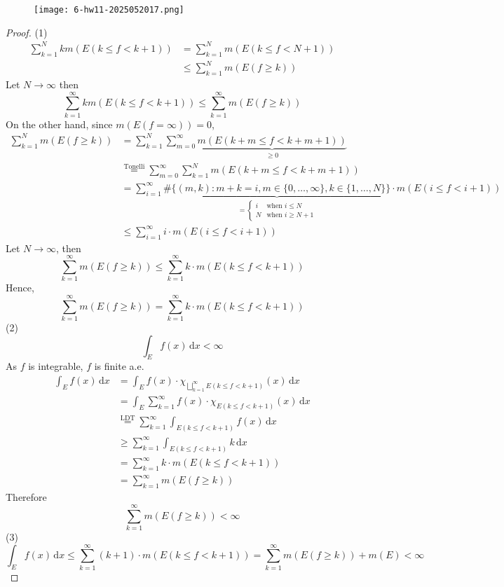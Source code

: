 \begin{exercise}
\begin{figure}[H]
\centering
\texttt{[image: 6-hw11-2025052017.png]}
\label{}
\end{figure}
\end{exercise}
\begin{proof}
(1)
\[
\begin{aligned}
\sum_{k=1}^{N} km(E(k\leq f<k+1)) & =\sum_{k=1}^{N} m(E(k\leq f<N+1))  \\
 & \leq \sum_{k=1}^{N} m(E(f\geq k)) 
\end{aligned}
\]
Let $N\to \infty$ then
\[
\sum_{k=1}^{\infty}km(E(k\leq f<k+1))\leq \sum_{k=1}^{\infty} m(E(f\geq k))
\]
On the other hand, since $m(E(f=\infty))=0$,
\[
\begin{aligned}
\sum_{k=1}^{N} m(E(f\geq k)) & =\sum_{k=1}^{N} \sum_{m=0}^{\infty} \underbrace{ m(E(k+m\leq f<k+m+1)) }_{ \geq 0 } \\
 & \overset{ \text{Tonelli} }{ = }\sum_{m=0}^{\infty} \sum_{k=1}^{N} m(E(k+m\leq f<k+m+1)) \\
 & =\sum_{i=1}^{\infty} \underbrace{ \#\{ (m,k):m+k=i,m\in \{ 0,\dots,\infty \},k\in \{ 1,\dots,N \} \} }_{ =\begin{cases}
i  & \text{when }i\leq N\\
N &  \text{when }i\geq N+1
\end{cases} }\cdot m(E(i\leq f<i+1)) \\
 & \leq \sum_{i=1}^{\infty} i\cdot m(E(i\leq f<i+1)) 
\end{aligned}
\]
Let $N\to \infty$, then
\[
\sum_{k=1}^{\infty} m(E(f\geq k))\leq \sum_{k=1}^{\infty} k\cdot m(E(k\leq f<k+1))
\]
Hence,
\[
\sum_{k=1}^{\infty} m(E(f\geq k))= \sum_{k=1}^{\infty} k\cdot m(E(k\leq f<k+1))
\]
(2)
\[
\int_{E}^{} f(x) \, \mathrm{d}x <\infty
\]
As $f$ is integrable, $f$ is finite a.e.
\[
\begin{aligned}
\int_{E}^{} f(x) \, \mathrm{d}x  & =\int_{E}^{} f(x)\cdot \chi_{\bigsqcup _{k=1}^{\infty} E(k\leq f<k+1)}(x) \, \mathrm{d}x  \\
 & =\int_{E}^{} \sum_{k=1}^{\infty} f(x)\cdot \chi_{E(k\leq f<k+1)}(x) \, \mathrm{d}x  \\
 & \overset{ \text{LDT} }{ = }\sum_{k=1}^{\infty } \int_{E(k\leq f<k+1)}^{} f(x) \, \mathrm{d}x  \\
 & \geq \sum_{k=1}^{\infty} \int_{E(k\leq f<k+1)}^{} k \, \mathrm{d}x  \\
 & =\sum_{k=1}^{\infty} k\cdot m(E(k\leq f<k+1))  \\
 & =\sum_{k=1}^{\infty} m(E(f\geq k))
\end{aligned}
\]
Therefore
\[
\sum_{k=1}^{\infty} m(E(f\geq k))<\infty
\]
(3)
\[
\int_{E}^{} f(x) \, \mathrm{d}x \leq \sum_{k=1}^{\infty} (k+1)\cdot m(E(k\leq f<k+1))=\sum_{k=1}^{\infty} m(E(f\geq k))+m(E)<\infty
\]
\end{proof}

